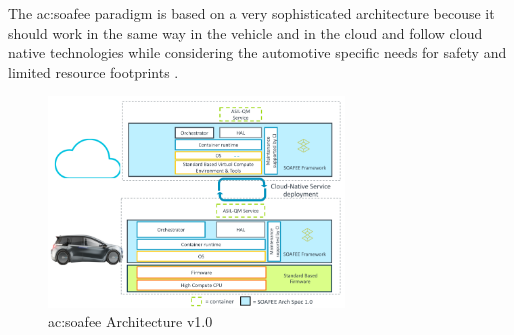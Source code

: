 The \gls{ac:soafee} paradigm is based on a very sophisticated architecture becouse it should work in the same way in the vehicle and in the cloud and follow cloud native technologies while considering the automotive specific needs for safety and limited resource footprints \cite{SoafeeArchitecture}.
\begin{figure}[h]  %
    \centering
    \includegraphics[width=0.7\textwidth]{images/SOAFEE_architecture.png}  %
    \caption{\gls{ac:soafee} Architecture v1.0 \cite{SoafeeArchitecture}}
    \label{fig:SoafeeArchitecture}
\end{figure}
